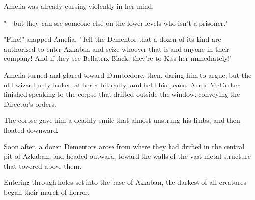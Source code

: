 Amelia was already cursing violently in her mind.

"—but they can see someone else on the lower levels who isn't a prisoner."

"Fine!" snapped Amelia. "Tell the Dementor that a dozen of its kind are
authorized to enter Azkaban and seize whoever that is and anyone in their
company! And if they see Bellatrix Black, they're to Kiss her immediately!"

Amelia turned and glared toward Dumbledore, then, daring him to argue; but the
old wizard only looked at her a bit sadly, and held his peace.
\sbreak
Auror McCusker finished speaking to the corpse that drifted outside the window,
conveying the Director's orders.

The corpse gave him a deathly smile that almost unstrung his limbs, and then
floated downward.

Soon after, a dozen Dementors arose from where they had drifted in the central
pit of Azkaban, and headed outward, toward the walls of the vast metal
structure that towered above them.

Entering through holes set into the base of Azkaban, the darkest of all
creatures began their march of horror.

